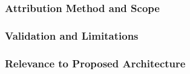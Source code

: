 \subsubsection{Attribution Method and Scope}
\subsubsection{Validation and Limitations}
\subsubsection{Relevance to Proposed Architecture}



